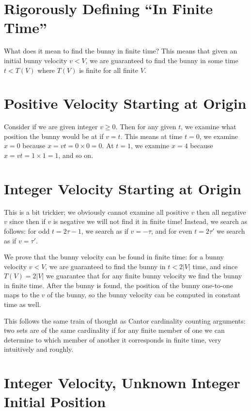 \documentclass[12pt]{report}
\newcommand{\abs}[1]{\left|#1\right|}
\begin{document}
\section{Rigorously Defining ``In Finite Time''}

What does it mean to find the bunny in finite time? This means that given an
initial bunny velocity $v < V$, we are guaranteed to find the bunny in some time
$t < T(V)$ where $T(V)$ is finite for all finite $V$.

\section{Positive Velocity Starting at Origin}

Consider if we are given integer $v \geq 0$. Then for any given $t$, we examine
what position the bunny would be at if $v = t$. This means at time $t = 0$, we
examine $x = 0$ because $x = vt = 0 \times 0 = 0$. At $t = 1$, we examine $x =
4$ because $x = vt = 1 \times 1 = 1$, and so on.

\section{Integer Velocity Starting at Origin}

This is a bit trickier; we obviously cannot examine all positive $v$ then all
negative $v$ since then if $v$ is negative we will not find it in finite time!
Instead, we search as follows: for odd $t = 2\tau - 1$, we search as if $v =
-\tau$, and for even $t = 2\tau'$ we search as if $v = \tau'$.

We prove that the bunny velocity can be found in finite time: for a bunny
velocity $v < V$, we are guaranteed to find the bunny in $t < 2\abs{V}$ time,
and since $T(V) = 2\abs{V}$ we guarantee that for any finite bunny velocity we
find the bunny in finite time. After the bunny is found, the position of the
bunny one-to-one maps to the $v$ of the bunny, so the bunny velocity can be
computed in constant time as well.

This follows the same train of thought as Cantor cardinality counting arguments:
two sets are of the same cardinality if for any finite member of one we can
determine to which member of another it corresponds in finite time, very
intuitively and roughly.

\section{Integer Velocity, Unknown Integer Initial Position}
\end{document}

